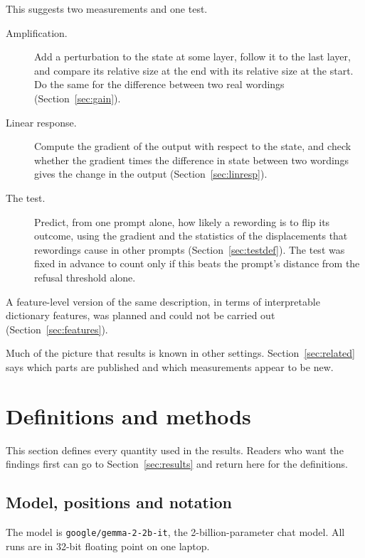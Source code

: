 \documentclass[11pt]{article}
\newcommand{\code}[1]{\texttt{#1}}
\begin{document}
This suggests two measurements and one test.

\begin{description}
\item[Amplification.] Add a perturbation to the state at some layer, follow it to the last layer, and compare its relative size at the end with its relative size at the start. Do the same for the difference between two real wordings (Section~\ref{sec:gain}).
\item[Linear response.] Compute the gradient of the output with respect to the state, and check whether the gradient times the difference in state between two wordings gives the change in the output (Section~\ref{sec:linresp}).
\item[The test.] Predict, from one prompt alone, how likely a rewording is to flip its outcome, using the gradient and the statistics of the displacements that rewordings cause in other prompts (Section~\ref{sec:testdef}). The test was fixed in advance to count only if this beats the prompt's distance from the refusal threshold alone.
\end{description}

A feature-level version of the same description, in terms of interpretable dictionary features, was planned and could not be carried out (Section~\ref{sec:features}).

Much of the picture that results is known in other settings. Section~\ref{sec:related} says which parts are published and which measurements appear to be new.

\section{Definitions and methods}
\label{sec:setup}

This section defines every quantity used in the results. Readers who want the findings first can go to Section~\ref{sec:results} and return here for the definitions.

\subsection{Model, positions and notation}
\label{sec:notation}

The model is \code{google/gemma-2-2b-it}, the 2-billion-parameter chat model. All runs are in 32-bit floating point on one laptop.
\end{document}
